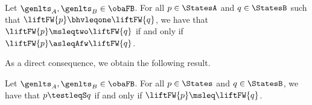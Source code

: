 \begin{lemma}
  \label{lem:acceptance-sets-and-must-sets-have-same-expressivity}
  Let $\genlts_A, \genlts_B \in \obaFB$.
  For all $\serverA \in \StatesA$ and $\serverB \in \StatesB $ such that $\liftFW{\serverA} \bhvleqone \liftFW{\serverB}$,
  we have that
  $\liftFW{\serverA} \msleqtwo \liftFW{\serverB}$ if and only if
  $\liftFW{\serverA} \asleqAfw \liftFW{\serverB}$.
\end{lemma}
\noindent
As a direct consequence, we obtain the following result.
\begin{theorem}
  \label{thm:testleqS-equals-mustsetleq}
    Let $\genlts_A, \genlts_B \in \obaFB$.
  For all $\serverA \in \States$  and
  $\serverB \in \StatesB $, we have that
  $\serverA \testleqS \serverB$ if and only if
  $\liftFW{\serverA} \msleq \liftFW{\serverB}$.
\end{theorem}


\newcommand{\failleq}{\mathrel{\leq_{\textsf{fail}}}}

